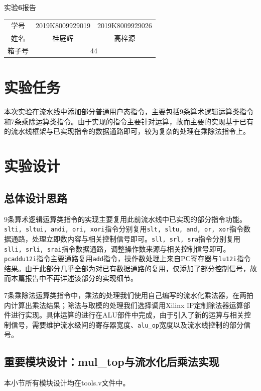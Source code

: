 \documentclass[UTF-8,twoside,c5size]{ctexart}
\begin{document}
	\begin{center}
		\heiti{}
		实验\textbf{6}报告
	\end{center}

	\begin{table}[!h]
		\raggedleft
		\begin{tabular}{ccc}
			{\heiti 学号} & {2019K8009929019} & {2019K8009929026} \\
			{\heiti 姓名} & 桂庭辉 & 高梓源 \\
			{\heiti 箱子号} & \multicolumn{2}{c}{44}
		\end{tabular}
	\end{table}
	
	\section{实验任务}
	
	本次实验在流水线中添加部分普通用户态指令，主要包括9条算术逻辑运算类指令和7条乘除运算类指令。由于实现的指令主要针对运算，故而主要的实现基于已有的流水线框架与已实现指令的数据通路即可，较为复杂的处理在乘除法指令上。
	
	\section{实验设计}	
	
	\subsection{总体设计思路}
	
	9条算术逻辑运算类指令的实现主要复用此前流水线中已实现的部分指令功能。\texttt{slti, sltui, andi, ori, xori}指令分别复用\texttt{slt, sltu, and, or, xor}指令数据通路，处理立即数内容与相关控制信号即可。\texttt{sll, srl, sra}指令分别复用\texttt{slli, srli, srai}指令数据通路，调整操作数来源与相关控制信号即可。\texttt{pcaddu12i}指令主要通路复用\texttt{add}指令，操作数处理上来自PC寄存器与\texttt{lu12i}指令结果。由于此部分几乎全部为对已有数据通路的复用，仅添加了部分控制信号，故而本篇报告中不再详述该部分的实现细节。
	
	7条乘除法运算类指令中，乘法的处理我们使用自己编写的流水化乘法器，在两拍内计算出乘法结果；除法与取模的处理我们选择调用Xilinx IP定制除法器运算部件进行实现。具体运算的进行在ALU部件中完成，由于引入了新的运算与相关控制信号，需要维护流水级间的寄存器宽度、\texttt{alu\_op}宽度以及流水线控制的部分信号。
	
	\subsection{重要模块设计：mul\_top与流水化后乘法实现}
	本小节所有模块设计均在tools.v文件中。
\end{document}
